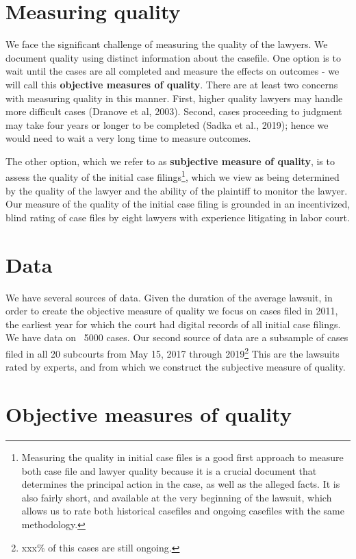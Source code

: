 \documentclass[oneside,11pt]{article}
\begin{document}
\section{Measuring quality}


We face the significant challenge of measuring the quality of the lawyers. We document quality using distinct information about the casefile. One option is to wait until the cases are all completed and measure the effects on outcomes - we will call this \textbf{objective measures of quality}. There are at least two concerns with measuring quality in this manner. First, higher quality lawyers may handle more difficult cases (Dranove et al, 2003). Second, cases proceeding to judgment may take four years or longer to be completed (Sadka et al., 2019); hence we would need to wait a very long time to measure outcomes.  


The other option, which we refer to as \textbf{subjective measure of quality}, is to assess the quality of the initial case filings\footnote{Measuring the quality in initial case files is a good first approach to measure both case file and lawyer quality because it is a crucial document that determines the principal action in the case, as well as the alleged facts. It is also fairly short, and available at the very beginning of the lawsuit, which allows us to rate both historical casefiles and ongoing casefiles with the same methodology.}, which we view as being determined by the quality of the lawyer and the ability of the plaintiff to monitor the lawyer. Our measure of the quality of the initial case filing is grounded in an incentivized, blind rating of case files by eight lawyers with experience litigating in labor court.


\section{Data}

We have several sources of data. Given the duration of the average lawsuit, in order to create the objective measure of quality we focus on cases filed in 2011, the earliest year for which the court had digital records of all initial case filings. We have data on ~5000 cases. Our second source of data are a subsample of cases filed in all 20 subcourts from May 15, 2017 through 2019\footnote{xxx\% of this cases are still ongoing.} This are the lawsuits rated by experts, and from which we construct the subjective measure of quality.


\section{Objective measures of quality}
\end{document}
